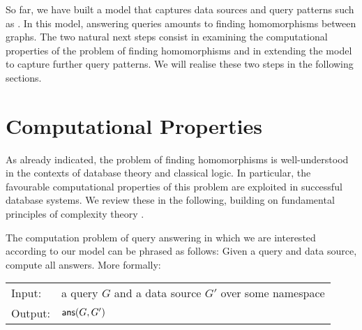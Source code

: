 So far, we have built a model that captures data sources and query patterns such as .
In this model, answering queries amounts to finding homomorphisms between graphs.
The two natural next steps consist in examining the computational properties
of the problem of finding homomorphisms
and in extending the model to capture further query patterns.
We will realise these two steps in the following sections.

\section{Computational Properties}
\label{sec:decision_problems}
\label{sec:decision_procedures}
\label{sec:computational_properties}

As already indicated, the problem of finding homomorphisms is well-understood in the contexts of
database theory and classical logic. In particular, the favourable computational properties of this problem
are exploited in successful database systems. We review these in the following,
building on fundamental principles of complexity theory \autocite{Arora2009}.

The computation problem of query answering in which we are interested according to our model can be 
phrased as follows: Given a query and data source, compute all answers.
More formally:

\begin{center}
  \begin{tabular}{ll}
    \hline\rule{0pt}{12pt}%
    Input:  & a query $G$ and a data source $G'$ over some namespace \namespace \\[2pt]
    Output: & $\textsf{ans}(G,G')$ \\[1pt]
    \hline
  \end{tabular}
\end{center}

